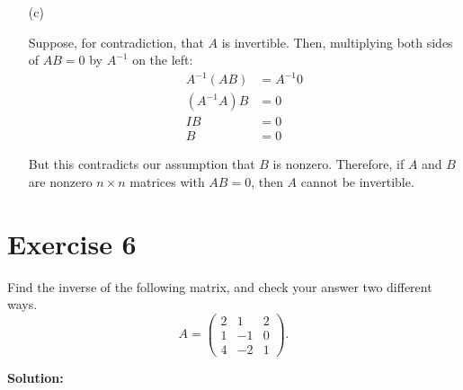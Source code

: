 \documentclass{article}
\begin{document}
\begin{enumerate}
\item[(c)]

Suppose, for contradiction, that $A$ is invertible. Then, multiplying both sides of $AB = 0$ by $A^{-1}$ on the left:
\begin{align*}
A^{-1}(AB) &= A^{-1}0 \\
(A^{-1}A)B &= 0 \\
IB &= 0 \\
B &= 0
\end{align*}

But this contradicts our assumption that $B$ is nonzero. Therefore, if $A$ and $B$ are nonzero $n \times n$ matrices with $AB = 0$, then $A$ cannot be invertible.
\end{enumerate}

\newpage

\section*{Exercise 6}
Find the inverse of the following matrix, and check your answer two different ways.
$$A = \begin{pmatrix} 2 & 1 & 2 \\ 1 & -1 & 0 \\ 4 & -2 & 1 \end{pmatrix}.$$

\textbf{Solution: } \\
\end{document}
